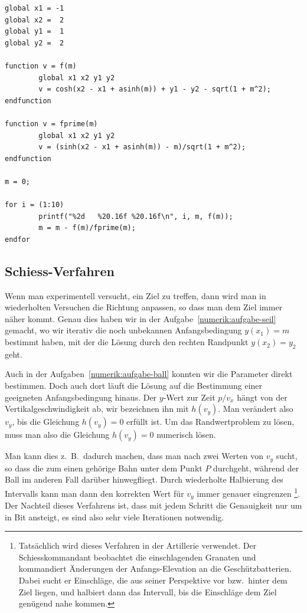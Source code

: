 \begin{lstlisting}[style=Octave,float,caption={Octave-Programm zur Bestimmung der Anfangssteigung $m$ im Kettenlinien-Problem},label={numerik:ketteprog}]
global x1 = -1
global x2 =  2
global y1 =  1
global y2 =  2

function v = f(m)
        global x1 x2 y1 y2
        v = cosh(x2 - x1 + asinh(m)) + y1 - y2 - sqrt(1 + m^2);
endfunction

function v = fprime(m)
        global x1 x2 y1 y2
        v = (sinh(x2 - x1 + asinh(m)) - m)/sqrt(1 + m^2);
endfunction

m = 0;

for i = (1:10)
        printf("%2d   %20.16f %20.16f\n", i, m, f(m));
        m = m - f(m)/fprime(m);
endfor
\end{lstlisting}

\subsection{Schiess-Verfahren\label{numerik:schiess-verfahren}}
%
Wenn man experimentell versucht, ein Ziel zu treffen, dann wird man
in wiederholten Versuchen die Richtung anpassen, so dass man dem Ziel
immer näher kommt.
Genau dies haben wir in der Aufgabe~\ref{numerik:aufgabe-seil} gemacht,
wo wir iterativ die noch unbekannen Anfangsbedingung $y(x_1)=m$ bestimmt
haben, mit der die Lösung durch den rechten Randpunkt $y(x_2)=y_2$ geht.

Auch in der Aufgaben~\ref{numerik:aufgabe-ball} konnten wir die
Parameter direkt bestimmen.
Doch auch dort läuft die Lösung auf die Bestimmung einer 
geeigneten Anfangsbedingung hinaus.
Der $y$-Wert zur Zeit $p/v_x$ hängt von der Vertikalgeschwindigkeit ab,
wir bezeichnen ihn mit $h(v_y)$.
Man verändert also $v_y$, bis die Gleichung $h(v_y)=0$ erfüllt ist.
Um das Randwertproblem zu lösen, muss man also die Gleichung $h(v_y)=0$
numerisch lösen.

Man kann dies z.~B.~dadurch machen, dass man nach zwei Werten von $v_y$
sucht, so dass die zum einen gehörige Bahn unter dem Punkt $P$ durchgeht,
während der Ball im anderen Fall darüber hinwegfliegt.
Durch wiederholte Halbierung des Intervalls kann man dann den korrekten
Wert für $v_y$ immer genauer eingrenzen%
\footnote{%
Tatsächlich wird dieses Verfahren in der Artillerie verwendet.
%
Der Schiesskommandant beobachtet die einschlagenden Granaten und kommandiert
Änderungen der Anfangs-Elevation an die Geschützbatterien.
Dabei sucht er Einschläge, die aus seiner Perspektive vor bzw.~hinter
dem Ziel liegen, und halbiert dann das Intervall, bis die Einschläge dem
Ziel genügend nahe kommen.}.
Der Nachteil dieses Verfahrens ist, dass mit jedem Schritt die Genauigkeit
nur um in Bit ansteigt, es sind also sehr viele Iterationen notwendig.

